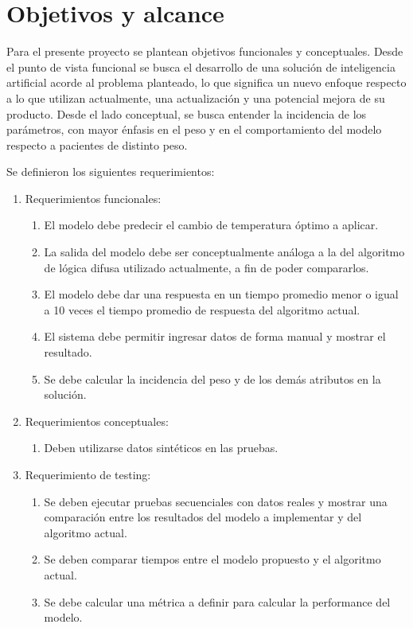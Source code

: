 \section{Objetivos y alcance}
Para el presente proyecto se plantean objetivos funcionales y conceptuales. Desde el punto de vista funcional se busca el desarrollo de una solución de inteligencia artificial acorde al problema planteado, lo que significa un nuevo enfoque respecto a lo que utilizan actualmente, una actualización y una potencial mejora de su producto. Desde el lado conceptual, se busca entender la incidencia de los parámetros, con mayor énfasis en el peso y en el comportamiento del modelo respecto a pacientes de distinto peso.

Se definieron los siguientes requerimientos:

\begin{enumerate}
	\item Requerimientos funcionales:
	\begin{enumerate}
		\item El modelo debe predecir el cambio de temperatura óptimo a aplicar.
		\item La salida del modelo debe ser conceptualmente análoga a la del algoritmo de lógica difusa utilizado actualmente, a fin de poder compararlos.
		\item El modelo debe dar una respuesta en un tiempo promedio menor o igual a 10 veces el tiempo promedio de respuesta del algoritmo actual.
		\item El sistema debe permitir ingresar datos de forma manual y mostrar el resultado.
		\item Se debe calcular la incidencia del peso y de los demás atributos en la solución.
	\end{enumerate}
	\item Requerimientos conceptuales:
	\begin{enumerate}
		\item Deben utilizarse datos sintéticos en las pruebas.
	\end{enumerate}
	\item Requerimiento de testing:
	\begin{enumerate}
		\item Se deben ejecutar pruebas secuenciales con datos reales y mostrar una comparación entre los resultados del modelo a implementar y del algoritmo actual.
		\item Se deben comparar tiempos entre el modelo propuesto y el algoritmo actual.
		\item Se debe calcular una métrica a definir para calcular la performance del modelo.

\end{enumerate}
\end{enumerate}
